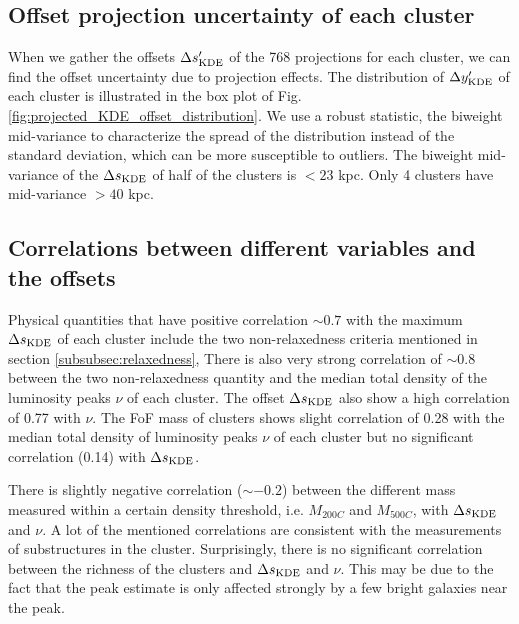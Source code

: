 \subsection{Offset projection uncertainty of each cluster}
When we gather the offsets $\Delta s_{\rm KDE}'$ of the 
768 projections for each cluster,
we can find the offset uncertainty due to projection effects.
The distribution of $\Delta y_{\rm KDE}'$ of each cluster is illustrated in the
box plot of Fig. 
\ref{fig:projected_KDE_offset_distribution}.
We use a robust statistic, the biweight mid-variance to characterize the spread
of the distribution instead of the standard deviation, which can be more
susceptible to outliers.
The biweight mid-variance of the $\Delta s_{\rm KDE}$ of half of the clusters
is $< 23$ kpc. Only 4 clusters have mid-variance $ > 40$ kpc. 
 
\subsection{Correlations between different variables and the offsets}

Physical quantities that have positive correlation $\sim 0.7$
with the maximum $\Delta s_{\rm KDE}$ of each cluster include the two
non-relaxedness criteria mentioned in section \ref{subsubsec:relaxedness},
There is also very strong correlation of $\sim 0.8$ 
between the two non-relaxedness quantity 
and the median total density of the luminosity peaks $\nu$ of each cluster.
The offset $\Delta s_{\rm KDE}$ also show a high
correlation of 0.77 with $\nu$. 
The FoF mass of clusters shows slight correlation of 0.28 with the median total density
of luminosity peaks $\nu$ of each cluster but no significant correlation (0.14) with
$\Delta s_{\rm KDE}$. 

There is slightly negative correlation ($\sim -0.2$) between the different mass measured within
a certain density threshold, i.e.  $M_{200C}$ and $M_{500C}$, with $\Delta
s_{\rm KDE}$ and $\nu$.  
A lot of the mentioned correlations are consistent with the
measurements of substructures in the cluster. 
Surprisingly, there is no significant correlation between the richness of the
clusters and $\Delta s_{\rm KDE}$ and $\nu$. This may be due to the fact that
the peak estimate is only affected strongly by a few bright galaxies near the
peak.

% 
 
